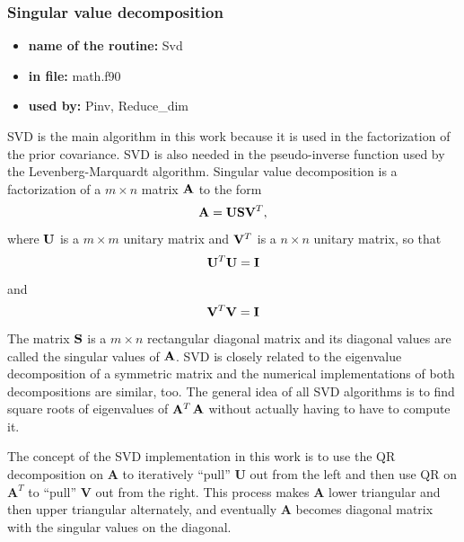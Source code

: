 \documentclass[12pt,a4paper]{article}
\newcommand{\mat}[1]{\mathbf{#1}}
\begin{document}
\subsubsection{Singular value decomposition}
\begin{itemize}
 \item \textbf{name of the routine:} Svd
 \item \textbf{in file:} math.f90
 \item \textbf{used by:} Pinv, Reduce\_dim
\end{itemize}
SVD is the main algorithm in this work because it is used in the factorization of the prior
covariance. SVD is also needed in the pseudo-inverse function used by 
the Levenberg-Marquardt algorithm. 
Singular value decomposition is a factorization of a $m \times n$ matrix 
$\mathrm{\bf{A}}$ to the form
\begin{equation}
\mathrm{\bf{A}}=\mathrm{\bf{U}}\mathrm{\bf{S}}\mathrm{\bf{V}}^T,
\end{equation}
where $\mathrm{\bf{U}}$ is a $m \times m$ unitary matrix and
$\mathrm{\bf{V}}^T$ is a  $n \times n$ unitary matrix, so that
\begin{equation}
\mathrm{\bf{U}}^T\mathrm{\bf{U}}=\mathrm{\bf{I}}
\end{equation}
and
\begin{equation}
\mathrm{\bf{V}}^T\mathrm{\bf{V}}=\mathrm{\bf{I}}
\end{equation}
The matrix $\mathrm{\bf{S}}$ is a $m \times n$ rectangular diagonal matrix and its diagonal
values are called the singular values of $\mathrm{\bf{A}}$.
SVD is closely related to the eigenvalue decomposition of a symmetric matrix and the numerical
implementations of both decompositions
are similar, too. The general idea of all SVD algorithms is to find                                                                                                                                                
square roots of eigenvalues of $\mathrm{\bf{A}}^T$$\mathrm{\bf{A}}$ without actually
having to have to compute it.       

The concept of the SVD implementation in this work is to 
use the QR decomposition on $\mat{A}$  to iteratively ``pull'' $\mat{U}$ out from
the left and then use QR on  $\mat{A}^T$ to ``pull'' $\mat{V}$ out from the right.
This process makes $\mat{A}$ lower triangular and then upper triangular 
alternately, and eventually $\mat{A}$ becomes diagonal matrix with the singular 
values on the diagonal.
\end{document}
